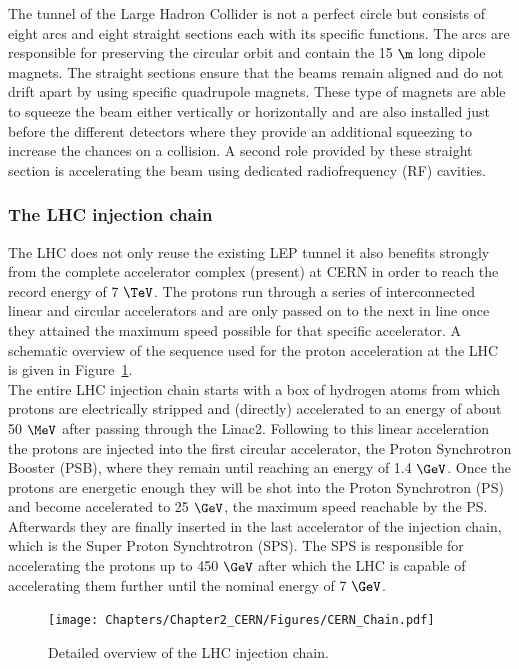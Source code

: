 The tunnel of the Large Hadron Collider is not a perfect circle but consists of eight arcs and eight straight sections each with its specific functions. 
The arcs are responsible for preserving the circular orbit and contain the 15 $\m$ long dipole magnets.
The straight sections ensure that the beams remain aligned and do not drift apart by using specific quadrupole magnets. These type of magnets are able to squeeze the beam either vertically or horizontally and are also installed just before the different detectors where they provide an additional squeezing to increase the chances on a collision. A second role provided by these straight section is accelerating the beam using dedicated radiofrequency (RF) cavities.

\subsubsection{The LHC injection chain}
The LHC does not only reuse the existing LEP tunnel it also benefits strongly from the complete accelerator complex (present) at CERN in order to reach the record energy of 7 $\TeV$. 
The protons run through a series of interconnected linear and circular accelerators and are only passed on to the next in line once they attained the maximum speed possible for that specific accelerator. A schematic overview of the sequence used for the proton acceleration at the LHC is given in Figure~\ref{fig::LHCChain}.\\
The entire LHC injection chain starts with a box of hydrogen atoms from which protons are electrically stripped and (directly) accelerated to an energy of about 50 $\MeV$ after passing through the Linac2.
Following to this linear acceleration the protons are injected into the first circular accelerator, the Proton Synchrotron Booster (PSB), where they remain until reaching an energy of 1.4 $\GeV$.
Once the protons are energetic enough they will be shot into the Proton Synchrotron (PS) and become accelerated to 25 $\GeV$, the maximum speed reachable by the PS.
Afterwards they are finally inserted in the last accelerator of the injection chain, which is the Super Proton Synchtrotron (SPS).
The SPS is responsible for accelerating the protons up to 450 $\GeV$ after which the LHC is capable of accelerating them further until the nominal energy of 7 $\GeV$.
\begin{figure}[h!t]
 \centering
 \texttt{[image: Chapters/Chapter2\_CERN/Figures/CERN\_Chain.pdf]}
 \caption{Detailed overview of the LHC injection chain.} \label{fig::LHCChain}
\end{figure}

